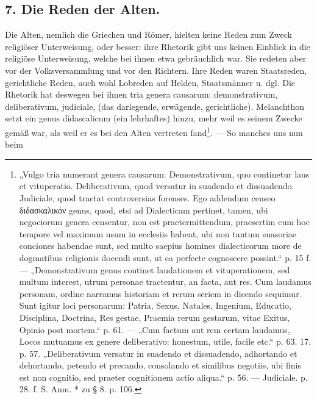 \subsection*{7. Die Reden der Alten.}

Die Alten, nemlich die Griechen und Römer, hielten keine Reden zum Zweck religiöser Unterweisung, oder besser: ihre Rhetorik gibt uns keinen Einblick in die religiöse Unterweisung, welche bei ihnen etwa gebräuchlich war. Sie redeten aber vor der Volksversammlung und vor den Richtern. Ihre Reden waren Staatsreden, gerichtliche Reden, auch wohl Lobreden auf Helden, Staatsmänner u. dgl. Die Rhetorik hat deswegen bei ihnen tria genera causarum: demonstrativum, deliberativum, judiciale, (das darlegende, erwägende, gerichtliche). Melanchthon setzt ein genus didascalicum (ein lehrhaftes) hinzu, mehr weil es seinem Zwecke gemäß war, als weil er es bei den Alten vertreten fand\footnote{„Vulgo tria numerant genera causarum: Demonstrativum, quo continetur laus et vituperatio. Deliberativum, quod versatur in suadendo et dissuadendo. Judiciale, quod tractat controversias forenses. Ego addendum censeo διδασκαλικόν genus, quod, etsi ad Dialecticam pertinet, tamen, ubi negociorum genera censentur, non est praetermittendum, praesertim cum hoc tempore vel maximum usum in ecclesiis habeat, ubi non tantum suasoriae conciones habendae sunt, sed multo saepius homines dialecticorum more de dogmatibus religionis docendi sunt, ut ea perfecte cognoscere possint.“ p. 15 f. — „Demonstrativum genus continet laudationem et vituperationem, sed multum interest, utrum personae tractentur, an facta, aut res. Cum laudamus personam, ordine narramus historiam et rerum seriem in dicendo sequimur. Sunt igitur loci personarum: Patria, Sexus, Natales, Ingenium, Educatio, Disciplina, Doctrina, Res gestae, Praemia rerum gestarum, vitae Exitus, Opinio post mortem.“ p. 61. — „Cum factum aut rem certam laudamus, Locos mutuamus ex genere deliberativo: honestum, utile, facile etc.“ p. 63. 17. p. 57. „Deliberativum versatur in suadendo et dissuadendo, adhortando et dehortando, petendo et precando, consolando et similibus negotiis, ubi finis est non cognitio, sed praeter cognitionem actio aliqua.“ p. 56. — Judiciale. p. 28. f. S. Anm. * zu § 8. p. 106.}. — So manches uns nun beim
